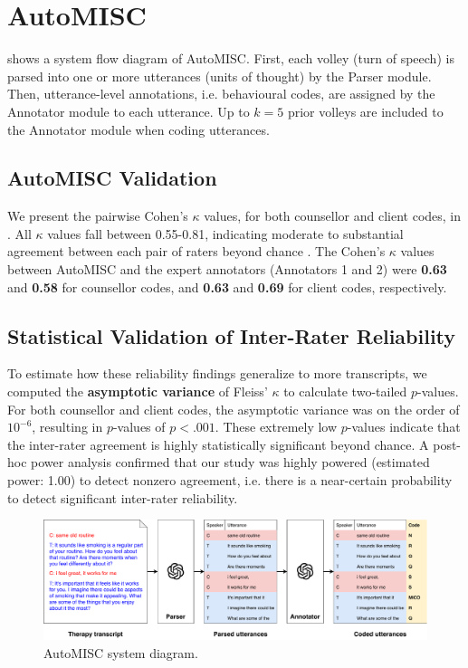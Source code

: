 \chapter{AutoMISC}
\label{app:automisc}


 shows a system flow diagram of AutoMISC. First, each volley (turn of speech) is parsed into one or more utterances (units of thought) by the Parser module. Then, utterance-level annotations, i.e. behavioural codes, are assigned by the Annotator module to each utterance. Up to $k=5$ prior volleys are included to the Annotator module when coding utterances.



\section*{AutoMISC Validation}
\label{appendix:automisc_val}


We present the pairwise Cohen's $\kappa$ values, for both counsellor and client codes, in . All $\kappa$ values fall between 0.55-0.81, indicating moderate to substantial agreement between each pair of raters beyond chance \cite{cohenrange}. The Cohen's $\kappa$ values between AutoMISC and the expert annotators (Annotators 1 and 2) were \textbf{0.63} and \textbf{0.58} for counsellor codes, and \textbf{0.63} and \textbf{0.69} for client codes, respectively. 

\section*{Statistical Validation of Inter-Rater Reliability}
To estimate how these reliability findings generalize to more transcripts, we computed the \textbf{asymptotic variance} of Fleiss' $\kappa$ to calculate two-tailed $p$-values. For both counsellor and client codes, the asymptotic variance was on the order of $10^{-6}$, resulting in $p$-values of $p<.001$. These extremely low $p$-values indicate that the inter-rater agreement is highly statistically significant beyond chance. A post-hoc power analysis confirmed that our study was highly powered (estimated power: 1.00) to detect nonzero agreement, i.e. there is a near-certain probability to detect significant inter-rater reliability.

\begin{figure}[!ht]
    \centering
    \includegraphics[width=\linewidth]{fig/automisc.pdf}
    \caption{AutoMISC system diagram.}
    \label{fig:automisc}
\end{figure}

